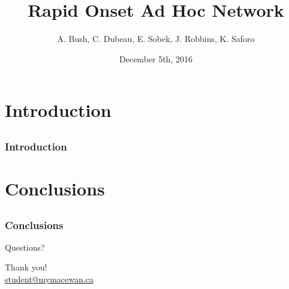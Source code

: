 \documentclass[compress]{beamer}
\title[Short Title]{Rapid Onset Ad Hoc Network}
\author[Short Author Names]{
  A. Bush,
  C. Dubeau,
  E. Sobek,
  J. Robbins,
  K. Saforo
}
\date{December 5th, 2016}
\institute{\vspace{0.2em}
  \texttt{[image: macewan]}\\[0.25em]
}
\begin{document}


\section{Introduction}
\subsection*{}

\begin{frame}[t]
  \frametitle{Introduction}

\end{frame}









\section{Conclusions}
\subsection*{}


\begin{frame}[t]
  \frametitle{Conclusions}

  Questions?
  
  \vfill

  \begin{center}
    Thank you!\\
    \url{student@mymacewan.ca}
  \end{center}

  \vfill
\end{frame}
\end{document}
